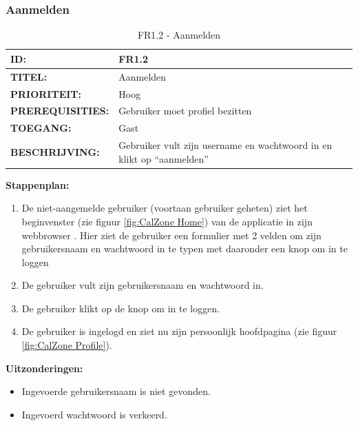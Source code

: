 \subsubsection{Aanmelden}
\noindent\begin{table}[H]
            \begin{tabular}{l | p{10cm}}
                \textbf{ID:} & FR1.2 \\ \hline
                \textbf{TITEL:} & Aanmelden \\ \hline
                \textbf{PRIORITEIT:} &  Hoog \\ \hline
                \textbf{PREREQUISITIES:} & Gebruiker moet profiel bezitten\\ \hline
                \textbf{TOEGANG:} &  Gast \\ \hline
                \textbf{BESCHRIJVING:} & Gebruiker vult zijn username en wachtwoord in en klikt op “aanmelden”\\
            \end{tabular}
            \caption{FR1.2 - Aanmelden}
            \label{tab:FR1.2 - Aanmelden}
        \end{table}
        
\textbf{Stappenplan:}
\begin{enumerate}
\item De niet-aangemelde gebruiker (voortaan gebruiker geheten) ziet het beginvenster (zie figuur \ref{fig:CalZone Home}) van de applicatie in zijn webbrowser . Hier ziet de gebruiker een formulier met 2 velden om zijn gebruikersnaam en wachtwoord in te typen met daaronder een knop om in te loggen
\item De gebruiker vult zijn gebruikersnaam en wachtwoord in.
\item De gebruiker klikt op de knop om in te loggen.
\item De gebruiker is ingelogd en ziet nu zijn persoonlijk hoofdpagina (zie figuur \ref{fig:CalZone Profile}).
\end{enumerate}

\textbf{Uitzonderingen:}
\begin{itemize}
\item Ingevoerde gebruikersnaam is niet gevonden.
\item Ingevoerd wachtwoord is verkeerd.
\end{itemize}

